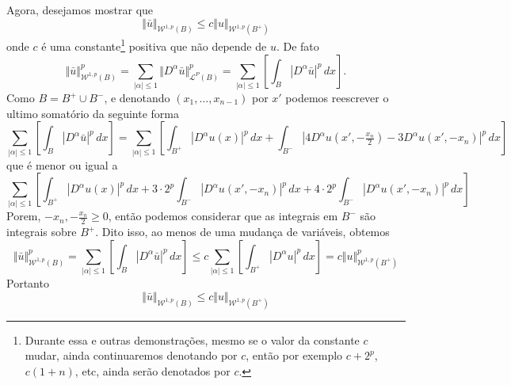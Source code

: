 \documentclass[a4paper, 11pt]{book}
\theoremstyle{definition}
\newcommand{\cL}{\mathcal{L}}
\newcommand{\cW}{\mathcal{W}}
\begin{document}
\begin{prf}
    Agora, desejamos mostrar que 
    \begin{equation} \label{eq:desigualdade-B-Bmais}
        \Vert \bar u \Vert_{\cW^{1,p}(B)} \leqslant c \Vert u \Vert_{\cW^{1,p}(B^+)}
    \end{equation}
    onde $c$ é uma constante\footnote{Durante essa e outras demonstrações, mesmo se o valor da constante $c$ mudar, ainda continuaremos denotando por $c$, então por exemplo $c + 2^p$, $c(1 + n)$, etc, ainda serão denotados por $c$.} positiva que não depende de $u$.
    De fato
    \[
        \Vert \bar u \Vert_{\cW^{1,p}(B)}^p = \sum_{|\alpha| \leqslant 1} \Vert D^\alpha\bar u \Vert_{\cL^P(B)}^p = \sum_{|\alpha| \leqslant 1} \left[\int_B |D^\alpha \bar u| ^p \,dx\right].
    \]
    Como $B = B^+ \cup B^-$, e denotando $(x_1,\dots,x_{n-1})$ por $x'$ podemos reescrever o ultimo somatório da seguinte forma
    \[
        \sum_{|\alpha| \leqslant 1} \left[\int_B |D^\alpha \bar u| ^p \,dx\right] = \sum_{|\alpha| \leqslant 1} \left[ \int_{B^+} |D^\alpha u(x)|^p \,dx + \int_{B^-} |4D^\alpha u(x',-\tfrac{x_n}{2}) - 3D^\alpha u(x',-x_n) |^p \,dx \right]
    \]
    que é menor ou igual a
    \[
        \sum_{|\alpha| \leqslant 1} \left[ \int_{B^+} |D^\alpha u(x)|^p \,dx + 3 \cdot 2^p\int_{B^-} |D^\alpha u(x',-x_n)|^p \,dx + 4 \cdot 2^p\int_{B^-} |D^\alpha u(x',-x_n)|^p \,dx   \right] 
    \]
    Porem, $-x_n, -\tfrac{x_n}{2} \geqslant 0$, então podemos considerar que as integrais em $B^-$ são integrais sobre $B^+$. Dito isso, ao menos de uma mudança de variáveis, obtemos
    \[
        \Vert \bar u \Vert_{\cW^{1,p}(B)}^p = \sum_{|\alpha| \leqslant 1} \left[\int_B |D^\alpha \bar u| ^p \,dx\right] \leqslant c\sum_{|\alpha| \leqslant 1} \left[ \int_{B^+}|D^\alpha u|^p \,dx \right] = c \Vert u \Vert_{\cW^{1,p}(B^+)}^p
    \]
    Portanto
    \[
        \Vert \bar u \Vert_{\cW^{1,p}(B)} \leqslant c \Vert u \Vert_{\cW^{1,p}(B^+)}
    \]


\end{prf}
\end{document}
